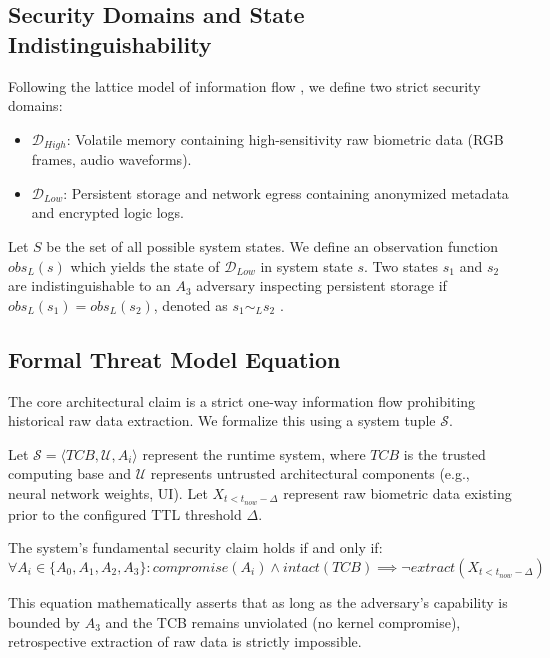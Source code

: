 \documentclass[conference]{IEEEtran}
\begin{document}
\subsection{Security Domains and State Indistinguishability}
Following the lattice model of information flow \cite{b12}, we define two strict security domains:
\begin{itemize}
    \item $\mathcal{D}_{High}$: Volatile memory containing high-sensitivity raw biometric data (RGB frames, audio waveforms).
    \item $\mathcal{D}_{Low}$: Persistent storage and network egress containing anonymized metadata and encrypted logic logs.
\end{itemize}

Let $S$ be the set of all possible system states. We define an observation function $obs_{L}(s)$ which yields the state of $\mathcal{D}_{Low}$ in system state $s$. Two states $s_1$ and $s_2$ are indistinguishable to an $A_3$ adversary inspecting persistent storage if $obs_{L}(s_1) = obs_{L}(s_2)$, denoted as $s_1 \sim_L s_2$ \cite{b11}.

\subsection{Formal Threat Model Equation}
The core architectural claim is a strict one-way information flow prohibiting historical raw data extraction. We formalize this using a system tuple $\mathcal{S}$.

Let $\mathcal{S} = \langle TCB, \mathcal{U}, A_i \rangle$ represent the runtime system, where $TCB$ is the trusted computing base and $\mathcal{U}$ represents untrusted architectural components (e.g., neural network weights, UI). Let $X_{t < t_{now} - \Delta}$ represent raw biometric data existing prior to the configured TTL threshold $\Delta$. 

The system's fundamental security claim holds if and only if:
\begin{equation}
\forall A_i \in \{A_0, A_1, A_2, A_3\} : compromise(A_i) \land intact(TCB) \implies \neg extract(X_{t < t_{now} - \Delta})
\end{equation}

This equation mathematically asserts that as long as the adversary's capability is bounded by $A_3$ and the TCB remains unviolated (no kernel compromise), retrospective extraction of raw data is strictly impossible.
\end{document}
